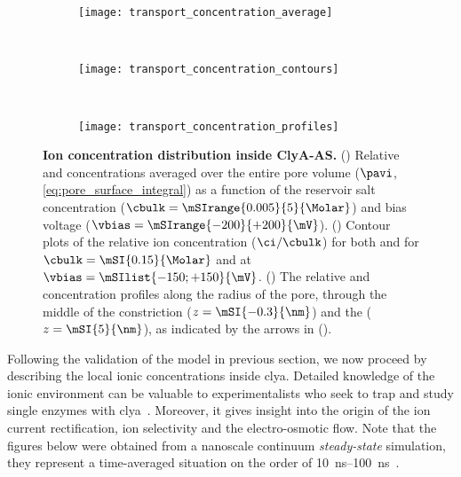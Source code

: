 %
\begin{figure*}[p]
  \centering

  \begin{subfigure}[t]{9cm}
    \centering
    \caption{}\vspace{-3mm}\label{fig:transport_concentration_average}
    \texttt{[image: transport\_concentration\_average]}
  \end{subfigure}
  \\
  \begin{subfigure}[t]{11.5cm}
    \centering
    \caption{}\vspace{-3mm}\label{fig:transport_concentration_contours}
    \texttt{[image: transport\_concentration\_contours]}
  \end{subfigure}
  \\
  \begin{subfigure}[t]{11.5cm}
    \centering
    \caption{}\vspace{-3mm}\label{fig:transport_concentration_profiles}
    \texttt{[image: transport\_concentration\_profiles]}
  \end{subfigure}

  \caption[Ion concentration distribution inside {ClyA-AS}]%
  {%
    \textbf{Ion concentration distribution inside {ClyA-AS}.}
    ()
    Relative \Na{} and \Cl{} concentrations averaged over the entire pore volume ($\pavi$,
    \cref{eq:pore_surface_integral}) as a function of the reservoir salt concentration ($\cbulk =
    \mSIrange{0.005}{5}{\Molar}$) and bias voltage ($\vbias = \mSIrange{-200}{+200}{\mV}$).
    ()
    Contour plots of the relative ion concentration ($\ci/\cbulk$) for both \Na{} and \Cl{} for $\cbulk =
    \mSI{0.15}{\Molar}$ and at $\vbias = \mSIlist{-150;+150}{\mV}$.
    ()
    The relative \Na{} and \Cl{} concentration profiles along the radius of the pore, through the middle of
    the constriction ($z = \mSI{-0.3}{\nm}$) and the \lumen{} ($z = \mSI{5}{\nm}$), as indicated by the arrows
    in ().
    }\label{fig:transport_concentration}
\end{figure*}
%


Following the validation of the model in previous section, we now proceed by describing the local ionic
concentrations inside \gls{clya}. Detailed knowledge of the ionic environment can be valuable to
experimentalists who seek to trap and study single enzymes with
\gls{clya}~\cite{Soskine-Biesemans-2015,VanMeervelt-2017,Galenkamp-2018}. Moreover, it gives insight into the
origin of the ion current rectification, ion selectivity and the electro-osmotic flow. Note that the figures
below were obtained from a nanoscale continuum \emph{steady-state} simulation, they represent a time-averaged
situation on the order of \SIrange{10}{100}{\ns}~\cite{Im-2002}.


